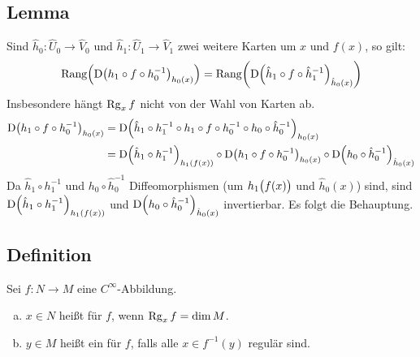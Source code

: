 \subsection[Lemma: Die Definition des Ranges hängt nicht von Karten ab]{Lemma} %
\label{sub:164}
Sind $\hat{h}_0 : \hat{U}_0 \to \hat{V}_0$ und $\hat{h}_1 : \hat{U}_1 \to \hat{V}_1$ zwei weitere Karten um $x$ und $f(x)$, so gilt:
\[
	\mathrm{Rang} \enbrace*{\D \enbrace*{h_1 \circ f \circ h_0 ^{-1}}_{h_0(x)} } = \mathrm{Rang} \enbrace*{\D \enbrace*{\hat{h}_1 \circ f \circ \hat{h}_1 ^{-1}}_{\hat{h}_0(x)} }  
\]
Insbesondere hängt $\Rg_x f$ nicht von der Wahl von Karten ab.
\begin{align*}
	\D \enbrace*{h_1 \circ f \circ h_0 ^{-1}}_{h_0(x)}&= \D \enbrace*{\hat{h}_1 \circ h_1 ^{-1} \circ h_1 \circ f \circ h_0 ^{-1} \circ h_0 \circ \hat{h}_0 ^{-1}}_{h_0(x)}\\
	&= \D \enbrace*{\hat{h}_1 \circ  h_1 ^{-1}}_{h_1\enbrace*{f(x)}} \circ  \D \enbrace*{h_1 \circ f \circ h_0 ^{-1}}_{h_0(x)} \circ \D \enbrace*{h_0 \circ \hat{h}_0 ^{-1}}_{\hat{h}_0(x)}   
\end{align*}
Da $\hat{h}_1 \circ h_1 ^{-1}$ und $h_0 \circ \hat{h}_0 ^{-1}$ Diffeomorphismen (um $h_1\enbrace[\big]{f(x)}$ und $\hat{h}_0 (x)$) sind, sind 
$\D \enbrace*{\hat{h}_1 \circ  h_1 ^{-1}}_{h_1\enbrace*{f(x)}}$ und $\D \enbrace*{h_0 \circ \hat{h}_0 ^{-1}}_{\hat{h}_0(x)}$ invertierbar. Es folgt die Behauptung. \bewende

\subsection[Definition: reguläre Werte]{Definition} %
\label{sub:166}
Sei $f : N \to M$ eine $C^\infty$-Abbildung.
\begin{enumerate}[a)]
	\item $x \in N$ heißt  für $f$, wenn $\Rg_x f = \dim M$.
	\item $y \in M$ heißt ein  für $f$, falls alle $x \in f ^{-1} (y)$ regulär sind.
\end{enumerate}

